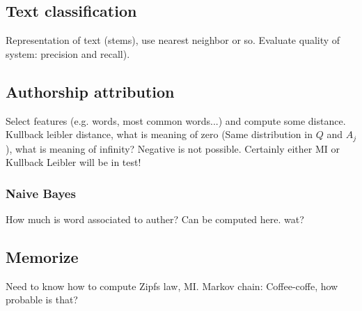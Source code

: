 \documentclass[11pt]{article}
\begin{document}
\subsection{Text classification}
Representation of text (stems), use nearest neighbor or so. Evaluate quality of system: precision and recall). 

\subsection{Authorship attribution}
Select features (e.g. words, most common words...) and compute some distance. Kullback leibler 
distance, what is meaning of zero (Same distribution in $Q$ and $A_j$), what is meaning of infinity? Negative is not possible. Certainly either MI or Kullback Leibler will be in test!

\subsubsection{Naive Bayes}
How much is word associated to auther? Can be computed here. wat?

\subsection{Memorize}
Need to know how to compute Zipfs law, MI. Markov chain: Coffee-coffe, how probable is that?
\end{document}
